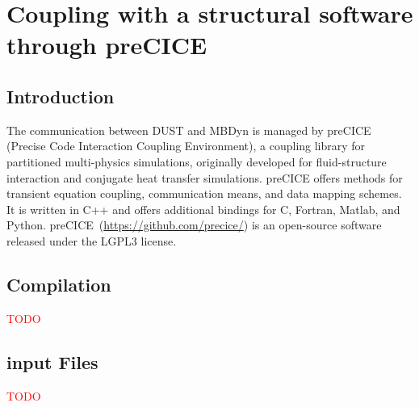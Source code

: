 \chapter{Coupling with a structural software through preCICE}
\section{Introduction}
The communication between DUST and MBDyn is managed by preCICE 
(Precise Code Interaction Coupling Environment), a coupling library for partitioned 
multi-physics simulations, originally developed for fluid-structure interaction 
and conjugate heat transfer simulations.
preCICE offers methods for transient equation coupling, communication means, 
and data mapping schemes. It is written in C++ and offers additional bindings 
for C, Fortran, Matlab, and Python.
preCICE~(\url{https://github.com/precice/}) is an open-source software released 
under the LGPL3 license. 

\section{Compilation}
\textcolor{red}{TODO}
\section{input Files}
\textcolor{red}{TODO}
